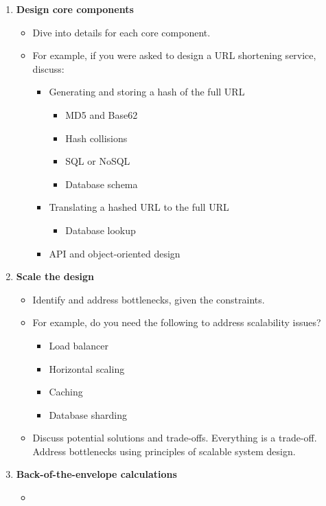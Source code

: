 \begin{process}
\begin{enumerate}
        \item \textbf{Design core components}
        \begin{itemize}
            \item Dive into details for each core component. 
            \item For example, if you were asked to design a URL shortening service, discuss:
            \begin{itemize}
                \item Generating and storing a hash of the full URL
                \begin{itemize}
                    \item MD5 and Base62
                    \item Hash collisions
                    \item SQL or NoSQL
                    \item Database schema
                \end{itemize}
                \item Translating a hashed URL to the full URL
                \begin{itemize}
                    \item Database lookup
                \end{itemize}
                \item API and object-oriented design
            \end{itemize}
        \end{itemize}
        
        \item \textbf{Scale the design}
        \begin{itemize}
            \item Identify and address bottlenecks, given the constraints. 
            \item For example, do you need the following to address scalability issues?
            \begin{itemize}
                \item Load balancer
                \item Horizontal scaling
                \item Caching
                \item Database sharding
            \end{itemize}
            \item Discuss potential solutions and trade-offs. Everything is a trade-off. Address bottlenecks using principles of scalable system design.
        \end{itemize}
        \item \textbf{Back-of-the-envelope calculations}
        \begin{itemize}
            \item 
        \end{itemize}
    \end{enumerate}
\end{process}

